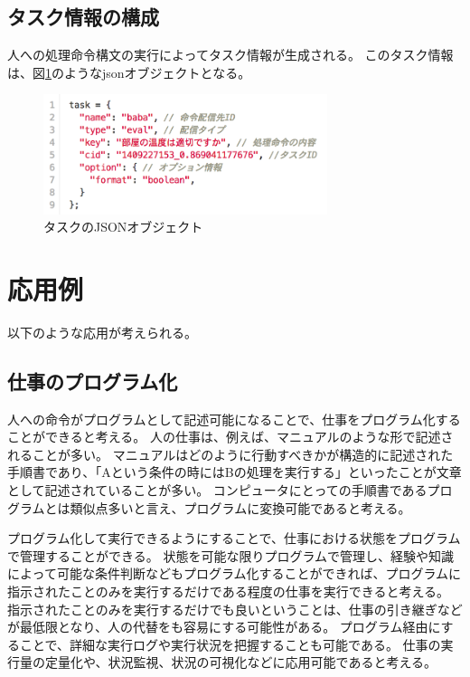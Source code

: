 \documentclass[twoside]{wiss}
\begin{document}
\subsection{タスク情報の構成}

人への処理命令構文の実行によってタスク情報が生成される。
このタスク情報は、図\ref{task}のようなjsonオブジェクトとなる。

\begin{figure}[!h]
  \includegraphics[width=83mm, bb=0 0 755 318]{./images/task.png}
  \caption{タスクのJSONオブジェクト}  
  \label{task}
\end{figure}

\section{応用例}

以下のような応用が考えられる。

\subsection{仕事のプログラム化}

人への命令がプログラムとして記述可能になることで、仕事をプログラム化することができると考える。
人の仕事は、例えば、マニュアルのような形で記述されることが多い。
マニュアルはどのように行動すべきかが構造的に記述された手順書であり、「Aという条件の時にはBの処理を実行する」といったことが文章として記述されていることが多い。
コンピュータにとっての手順書であるプログラムとは類似点多いと言え、プログラムに変換可能であると考える。

プログラム化して実行できるようにすることで、仕事における状態をプログラムで管理することができる。
状態を可能な限りプログラムで管理し、経験や知識によって可能な条件判断などもプログラム化することができれば、プログラムに指示されたことのみを実行するだけである程度の仕事を実行できると考える。
指示されたことのみを実行するだけでも良いということは、仕事の引き継ぎなどが最低限となり、人の代替をも容易にする可能性がある。
プログラム経由にすることで、詳細な実行ログや実行状況を把握することも可能である。
仕事の実行量の定量化や、状況監視、状況の可視化などに応用可能であると考える。
\end{document}

